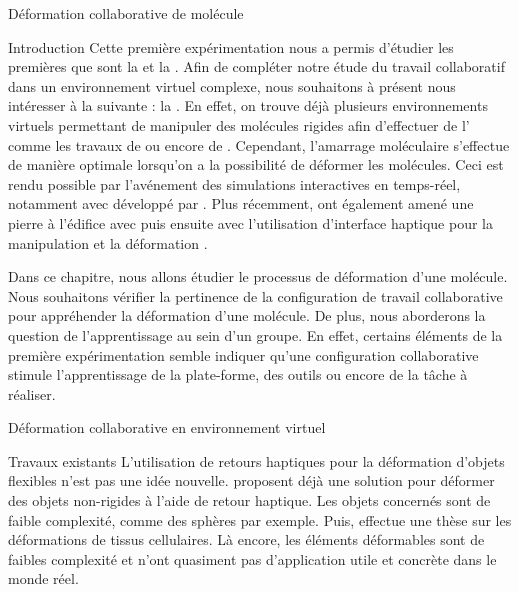 \documentclass[myfrancais]{mythesis}
\begin{document}
	\begin{mychapter}{Déformation collaborative de molécule}
		\begin{mysection}{Introduction}
			Cette première expérimentation nous a permis d'étudier les premières  que sont la  et la .
			Afin de compléter notre étude du travail collaboratif dans un environnement virtuel complexe, nous souhaitons à présent nous intéresser à la  suivante : la .
			En effet, on trouve déjà plusieurs environnements virtuels permettant de manipuler des molécules rigides afin d'effectuer de l' comme les travaux de  ou encore de .
			Cependant, l'amarrage moléculaire s'effectue de manière optimale lorsqu'on a la possibilité de déformer les molécules.
			Ceci est rendu possible par l'avénement des simulations interactives en temps-réel, notamment avec  développé par .
			Plus récemment,  ont également amené une pierre à l'édifice avec \myMDDriver puis ensuite avec l'utilisation d'interface haptique pour la manipulation et la déformation .

			Dans ce chapitre, nous allons étudier le processus de déformation d'une molécule.
			Nous souhaitons vérifier la pertinence de la configuration de travail collaborative pour appréhender la déformation d'une molécule.
			De plus, nous aborderons la question de l'apprentissage au sein d'un groupe.
			En effet, certains éléments de la première expérimentation semble indiquer qu'une configuration collaborative stimule l'apprentissage de la plate-forme, des outils ou encore de la tâche à réaliser.
		\end{mysection}
		\begin{mysection}{Déformation collaborative en environnement virtuel}
			\begin{mysubsection}{Travaux existants}
				L'utilisation de retours haptiques pour la déformation d'objets flexibles n'est pas une idée nouvelle.
				 proposent déjà une solution pour déformer des objets non-rigides à l'aide de retour haptique.
				Les objets concernés sont de faible complexité, comme des sphères par exemple.
				Puis,  effectue une thèse sur les déformations de tissus cellulaires.
				Là encore, les éléments déformables sont de faibles complexité et n'ont quasiment pas d'application utile et concrète dans le monde réel.


\end{mysubsection}
\end{mysection}
\end{mychapter}
\end{document}
